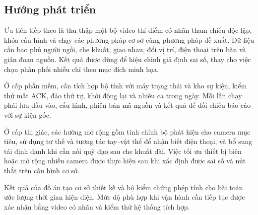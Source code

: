 \subsection{Hướng phát triển}
Ưu tiên tiếp theo là thu thập một bộ video thí điểm có nhãn tham chiếu độc lập, khóa cấu hình và chạy các phương pháp cơ sở cùng phương pháp đề xuất. Dữ liệu cần bao phủ người ngồi, che khuất, giao nhau, đổi vị trí, điện thoại trên bàn và gián đoạn nguồn. Kết quả được dùng để hiệu chỉnh giả định sai số, thay cho việc chọn phân phối nhiễu chỉ theo mục đích minh họa.

Ở cấp phần mềm, cần tích hợp bộ tính với máy trạng thái và kho sự kiện, kiểm thử mất ACK, đảo thứ tự, khởi động lại và nhiều ca trong ngày. Mỗi lần chạy phải lưu đầu vào, cấu hình, phiên bản mã nguồn và kết quả để đối chiếu báo cáo với sự kiện gốc.

Ở cấp thị giác, các hướng mở rộng gồm tinh chỉnh bộ phát hiện cho camera mục tiêu, sử dụng tư thế và tương tác tay--vật thể để nhận biết điện thoại, và bổ sung tái định danh khi cần nối quỹ đạo sau che khuất dài. Việc tối ưu thiết bị biên hoặc mở rộng nhiều camera được thực hiện sau khi xác định được sai số và nút thắt trên cấu hình cơ sở.

Kết quả của đồ án tạo cơ sở thiết kế và bộ kiểm chứng phép tính cho bài toán ước lượng thời gian hiện diện. Mức độ phù hợp khi vận hành cần tiếp tục được xác nhận bằng video có nhãn và kiểm thử hệ thống tích hợp.
